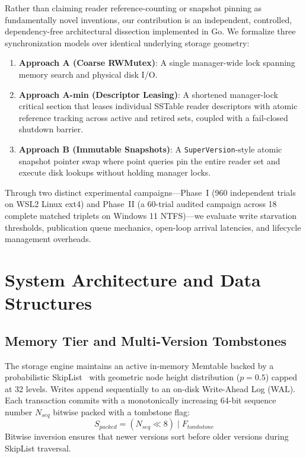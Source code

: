 \documentclass[conference]{IEEEtran}
\begin{document}
Rather than claiming reader reference-counting or snapshot pinning as fundamentally novel inventions, our contribution is an independent, controlled, dependency-free architectural dissection implemented in Go. We formalize three synchronization models over identical underlying storage geometry:
\begin{enumerate}
    \item \textbf{Approach A (Coarse RWMutex)}: A single manager-wide lock spanning memory search and physical disk I/O.
    \item \textbf{Approach A-min (Descriptor Leasing)}: A shortened manager-lock critical section that leases individual SSTable reader descriptors with atomic reference tracking across active and retired sets, coupled with a fail-closed shutdown barrier.
    \item \textbf{Approach B (Immutable Snapshots)}: A \texttt{SuperVersion}-style atomic snapshot pointer swap where point queries pin the entire reader set and execute disk lookups without holding manager locks.
\end{enumerate}

Through two distinct experimental campaigns—Phase~I (960 independent trials on WSL2 Linux ext4) and Phase~II (a 60-trial audited campaign across 18 complete matched triplets on Windows 11 NTFS)—we evaluate write starvation thresholds, publication queue mechanics, open-loop arrival latencies, and lifecycle management overheads.

\section{System Architecture and Data Structures}

\subsection{Memory Tier and Multi-Version Tombstones}
The storage engine maintains an active in-memory Memtable backed by a probabilistic SkipList~\cite{pugh1990skiplists} with geometric node height distribution ($p = 0.5$) capped at 32 levels. Writes append sequentially to an on-disk Write-Ahead Log (WAL). Each transaction commits with a monotonically increasing 64-bit sequence number $N_{seq}$ bitwise packed with a tombstone flag:
\begin{equation}
S_{packed} = (N_{seq} \ll 8) \mid F_{tombstone}
\label{eq:packed}
\end{equation}
Bitwise inversion ensures that newer versions sort before older versions during SkipList traversal.
\end{document}
